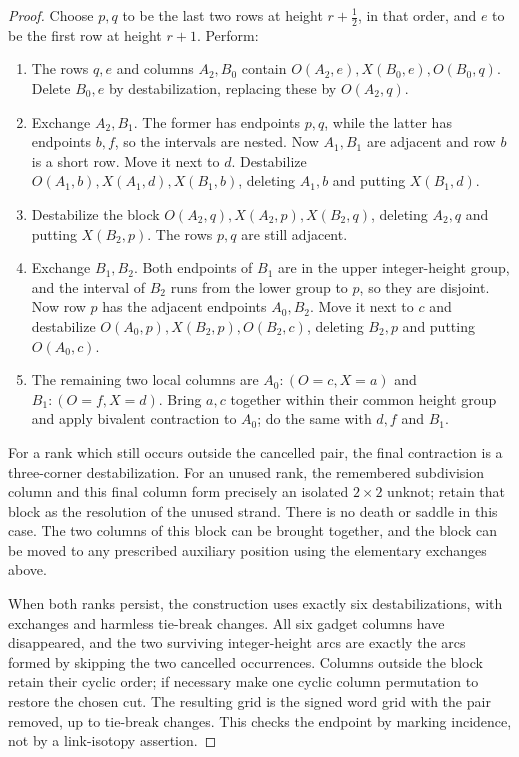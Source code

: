\documentclass[11pt,a4paper]{article}
\theoremstyle{remark}
\begin{document}
\begin{proof}
Choose $p,q$ to be the last two rows at height $r+\tfrac12$, in that
order, and $e$ to be the first row at height $r+1$.  Perform:
\begin{enumerate}
\item The rows $q,e$ and columns $A_2,B_0$ contain
      $O(A_2,e),X(B_0,e),O(B_0,q)$.  Delete $B_0,e$ by
      destabilization, replacing these by $O(A_2,q)$.
\item Exchange $A_2,B_1$.  The former has endpoints $p,q$, while the
      latter has endpoints $b,f$, so the intervals are nested.  Now
      $A_1,B_1$ are adjacent and row $b$ is a short row.  Move it next
      to $d$.  Destabilize
      $O(A_1,b),X(A_1,d),X(B_1,b)$, deleting $A_1,b$ and putting
      $X(B_1,d)$.
\item Destabilize the block
      $O(A_2,q),X(A_2,p),X(B_2,q)$, deleting $A_2,q$ and putting
      $X(B_2,p)$.  The rows $p,q$ are still adjacent.
\item Exchange $B_1,B_2$.  Both endpoints of $B_1$ are in the upper
      integer-height group, and the interval of $B_2$ runs from the
      lower group to $p$, so they are disjoint.  Now row $p$ has the
      adjacent endpoints $A_0,B_2$.  Move it next to $c$ and
      destabilize
      $O(A_0,p),X(B_2,p),O(B_2,c)$, deleting $B_2,p$ and putting
      $O(A_0,c)$.
\item The remaining two local columns are
      $A_0:(O=c,X=a)$ and $B_1:(O=f,X=d)$.  Bring $a,c$ together
      within their common height group and apply bivalent contraction
      to $A_0$; do the same with $d,f$ and $B_1$.
\end{enumerate}
For a rank which still occurs outside the cancelled pair, the final
contraction is a three-corner destabilization.  For an unused rank, the
remembered subdivision column and this final column form precisely an
isolated $2\times2$ unknot; retain that block as the resolution of the
unused strand.  There is no death or saddle in this case.  The two
columns of this block can be brought together, and the block can be
moved to any prescribed auxiliary position using the elementary
exchanges above.

When both ranks persist, the construction uses exactly six
destabilizations, with exchanges and harmless tie-break changes.  All
six gadget columns have disappeared, and the two surviving
integer-height arcs are exactly the arcs formed by skipping the two
cancelled occurrences.  Columns outside the block retain their cyclic
order; if necessary make one cyclic column permutation to restore the
chosen cut.  The resulting grid is the signed word grid with the pair
removed, up to tie-break changes.  This checks the endpoint by marking
incidence, not by a link-isotopy assertion.


\end{proof}
\end{document}
